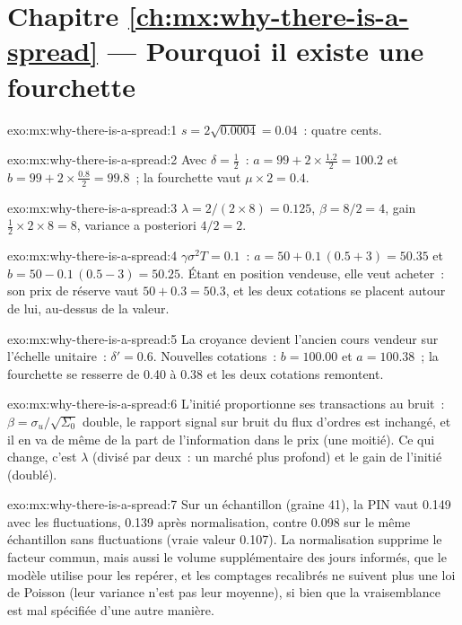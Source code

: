 \section*{Chapitre \ref{ch:mx:why-there-is-a-spread} --- Pourquoi il existe une fourchette}

\begin{solution}{exo:mx:why-there-is-a-spread:1}
$s=2\sqrt{0.0004}=0.04$~: quatre cents.
\end{solution}

\begin{solution}{exo:mx:why-there-is-a-spread:2}
Avec $\delta=\tfrac12$~: $a=99+2\times\tfrac{1.2}{2}=100.2$ et $b=99+2\times\tfrac{0.8}{2}=99.8$~; la fourchette vaut $\mu\times2=0.4$.
\end{solution}

\begin{solution}{exo:mx:why-there-is-a-spread:3}
$\lambda=2/(2\times8)=0.125$, $\beta=8/2=4$, gain $\tfrac12\times2\times8=8$, variance a posteriori $4/2=2$.
\end{solution}

\begin{solution}{exo:mx:why-there-is-a-spread:4}
$\gamma\sigma^2T=0.1$~: $a=50+0.1\,(0.5+3)=50.35$ et $b=50-0.1\,(0.5-3)=50.25$. Étant en position vendeuse, elle veut acheter~: son prix de réserve vaut
$50+0.3=50.3$, et les deux cotations se placent autour de lui, au-dessus de la valeur.
\end{solution}

\begin{solution}{exo:mx:why-there-is-a-spread:5}
La croyance devient l'ancien cours vendeur sur l'échelle unitaire~: $\delta'=0.6$. Nouvelles cotations~: $b=100.00$ et $a=100.38$~; la fourchette se resserre de 0.40 à 0.38 et les deux cotations
remontent.
\end{solution}

\begin{solution}{exo:mx:why-there-is-a-spread:6}
L'initié proportionne ses transactions au bruit~: $\beta=\sigma_u/\sqrt{\Sigma_0}$ double, le rapport signal sur bruit du flux d'ordres est inchangé, et il en va de même de
la part de l'information dans le prix (une moitié). Ce qui change, c'est $\lambda$ (divisé par deux~: un marché plus profond) et le gain de l'initié (doublé).
\end{solution}

\begin{solution}{exo:mx:why-there-is-a-spread:7}
Sur un échantillon (graine 41), la PIN vaut 0.149 avec les fluctuations, 0.139 après normalisation, contre 0.098 sur le même échantillon sans fluctuations (vraie valeur 0.107). La normalisation supprime
le facteur commun, mais aussi le volume supplémentaire des jours informés, que le modèle utilise pour les repérer, et les comptages recalibrés ne suivent plus une loi de Poisson (leur
variance n'est pas leur moyenne), si bien que la vraisemblance est mal spécifiée d'une autre manière.
\end{solution}

